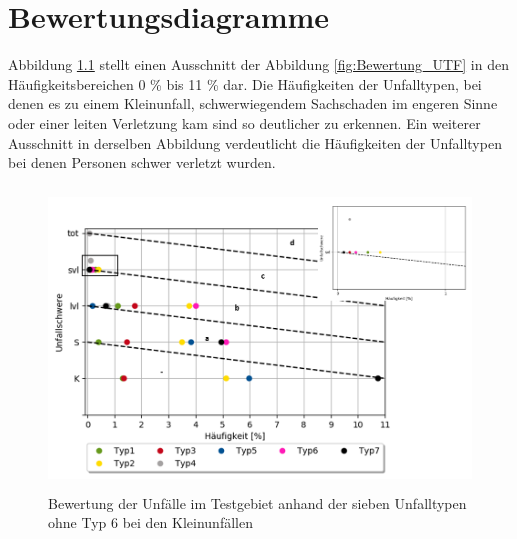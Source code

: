 
\chapter{Bewertungsdiagramme}\label{chapter:Bewertungsdiagramme}
Abbildung \ref{fig:Bewertung_UTF(2)} stellt einen Ausschnitt der Abbildung \ref{fig:Bewertung_UTF} in den Häufigkeitsbereichen 0 \% bis 11 \% dar. Die Häufigkeiten der Unfalltypen, bei denen es zu einem Kleinunfall, schwerwiegendem Sachschaden im engeren Sinne oder einer leiten Verletzung kam sind so deutlicher zu erkennen. Ein weiterer Ausschnitt in derselben Abbildung verdeutlicht die Häufigkeiten der Unfalltypen bei denen Personen schwer verletzt wurden.

\begin{savenotes}
	\begin{figure}[H]
		\centering
		\includegraphics[width=12cm,height=8cm]{figures/Bewertung_UTF(2)}
		\caption[Bewertung der Unfälle im Testgebiet anhand der sieben Unfalltypen ohne Typ 6 bei den Kleinunfällen]{Bewertung der Unfälle im Testgebiet anhand der sieben Unfalltypen ohne Typ 6 bei den Kleinunfällen}\label{fig:Bewertung_UTF(2)}
	\end{figure}
\end{savenotes}



